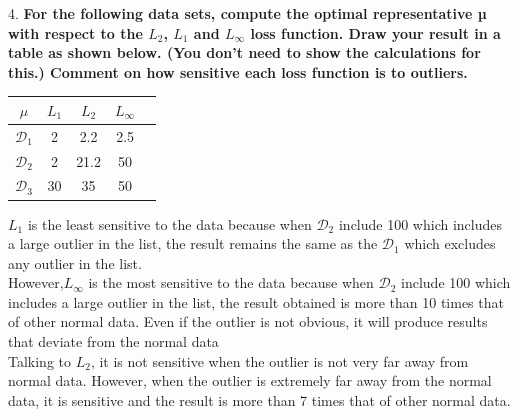 \documentclass{article}
\begin{document}
4. \textbf{For the following data sets, compute the optimal representative µ with respect to the $L_2$, $L_1$ and $L_{\infty}$
loss function. Draw your result in a table as shown below. (You don’t need to show the calculations for
this.) Comment on how sensitive each loss function is to outliers.}

\begin{center}
\begin{tabular}{ |c|c|c|c|c|} 
\hline
$\mu$ & $L_1$ & $L_2$ & $L_{\infty}$\\
\hline
$\mathcal{D}_1$ & 2 & 2.2 & 2.5\\ 
$\mathcal{D}_2$ & 2 & 21.2 & 50\\ 
$\mathcal{D}_3$ & 30 & 35 & 50\\ 
\hline
\end{tabular}
\end{center}

$L_1$ is the least sensitive to the data because when $\mathcal{D}_2$ include 100 which includes a large outlier in the list, the result remains the same as the $\mathcal{D}_1$ which excludes any outlier in the list.\\
However,$L_{\infty}$ is the most sensitive to the data because when $\mathcal{D}_2$ include 100 which includes a large outlier in the list, the result obtained is more than 10 times that of other normal data. Even if the outlier is not obvious, it will produce results that deviate from the normal data\\
Talking to $L_2$, it is not sensitive when the outlier is not very far away from normal data. However, when the outlier is extremely far away from the normal data, it is sensitive and the result is more than 7 times that of other normal data.
\end{document}
